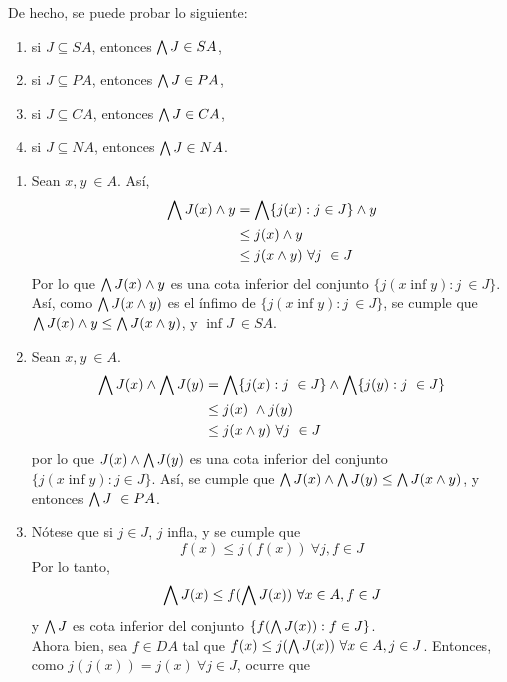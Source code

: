 De hecho, se puede probar lo siguiente:
\begin{exe}%
    \leavevmode
  \begin{enumerate}
    \item si $J\subseteq SA$, entonces $\bigwedge J\in SA$,
    \item si $J\subseteq PA$, entonces $\bigwedge J\in PA$,
    \item si $J\subseteq CA$, entonces $\bigwedge J\in CA$,
    \item si $J\subseteq NA$, entonces $\bigwedge J\in NA$.
  \end{enumerate}
\end{exe}
\begin{sol}
    \begin{enumerate}
        \item Sean $x,y \ \in A$.  Así, 
        \begin{align*}
            \bigwedge J(x)\wedge y&=\bigwedge\{j(x):j\in J\}\wedge y\\
            &\leq j(x)\wedge y\\
            &\leq j(x\wedge y) \ \forall j \ \in J
        \end{align*}
        Por lo que $\bigwedge J(x)\wedge y$ es una cota inferior del conjunto $\{j(x\inf y) : j \ \in J\}$. Así, como $\bigwedge J(x\wedge y)$ es el ínfimo de $\{j(x\inf y) : j \ \in J\}$, se cumple que $\bigwedge J(x)\wedge y\leq \bigwedge J(x\wedge y)$, y $\inf J \ \in SA$.
        \item Sean $x, y \ \in A$. 
        \begin{align*}
            \bigwedge J(x)\wedge \bigwedge J(y)&=\bigwedge\{j(x):j \ \in J\} \wedge \bigwedge \{j(y) : j \ \in J\}\\
            &\leq j(x) \ \wedge j(y) \\
            &\leq j(x\wedge y) \ \forall j \ \in J
        \end{align*}
        por lo que $J(x)\wedge \bigwedge J(y)$ es una cota inferior del conjunto $\{j(x\inf y): j \in J\}$. Así, se cumple que $\bigwedge J(x) \wedge \bigwedge J(y)\leq \bigwedge J(x\wedge y)$, y entonces $\bigwedge J \ \in PA$.
        \item Nótese que si $j\in J$, $j$ infla, y se cumple que 
        $$f(x)\leq j(f(x)) \ \forall j,f \in J$$
        Por lo tanto, 
        $$\Inf J(x)\leq f(\Inf J(x)) \ \forall x\in A, f\in J$$
        y $\bigwedge J$ es cota inferior del conjunto $\{f(\bigwedge J(x)):f\in J\}$.
        \\
        Ahora bien, sea $f\in DA$ tal que $f(x) \leq j(\bigwedge J(x)) \ \forall x\in A, j\in J$. Entonces, como $j(j(x))=j(x) \ \forall j\in J$, ocurre que 

\end{enumerate}
\end{sol}
